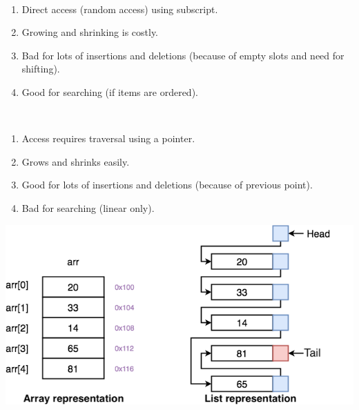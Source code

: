 \\
\vspace{-.5cm}
\begin{enumerate}
    \item Direct access (random access) using subscript.
    \item Growing and shrinking is costly.
    \item Bad for lots of insertions and deletions (because of empty slots and need for shifting).
    \item Good for searching (if items are ordered).
\end{enumerate}

\\
\vspace{-.5cm}
\begin{enumerate}
    \item Access requires traversal using a pointer.
    \item Grows and shrinks easily.
    \item Good for lots of insertions and deletions (because of previous point).
    \item Bad for searching (linear only).
\end{enumerate}

\begin{center}
\includegraphics[scale=.35]{images/array-vs-linked-list.png}
\end{center}

